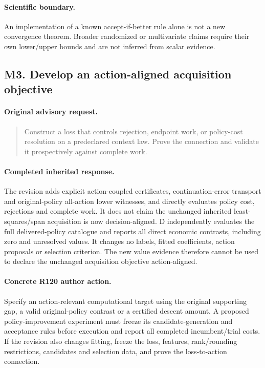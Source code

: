 \paragraph{Scientific boundary.}
An implementation of a known accept-if-better rule alone is not a new convergence theorem. Broader randomized or multivariate claims require their own lower/upper bounds and are not inferred from scalar evidence.

\subsection{M3. Develop an action-aligned acquisition objective}
\label{response120:M3}
\paragraph{Original advisory request.}
\begin{quote}
Construct a loss that controls rejection, endpoint work, or policy-cost resolution on a predeclared context law. Prove the connection and validate it prospectively against complete work.
\end{quote}
\paragraph{Completed inherited response.}
The revision adds explicit action-coupled certificates, continuation-error transport and original-policy all-action lower witnesses, and directly evaluates policy cost, rejections and complete work. It does not claim the unchanged inherited least-squares/span acquisition is now decision-aligned. D independently evaluates the full delivered-policy catalogue and reports all direct economic contrasts, including zero and unresolved values. It changes no labels, fitted coefficients, action proposals or selection criterion. The new value evidence therefore cannot be used to declare the unchanged acquisition objective action-aligned.
\paragraph{Concrete R120 author action.}
Specify an action-relevant computational target using the original supporting gap, a valid original-policy contrast or a certified descent amount. A proposed policy-improvement experiment must freeze its candidate-generation and acceptance rules before execution and report all completed incumbent/trial costs. If the revision also changes fitting, freeze the loss, features, rank/rounding restrictions, candidates and selection data, and prove the loss-to-action connection.
